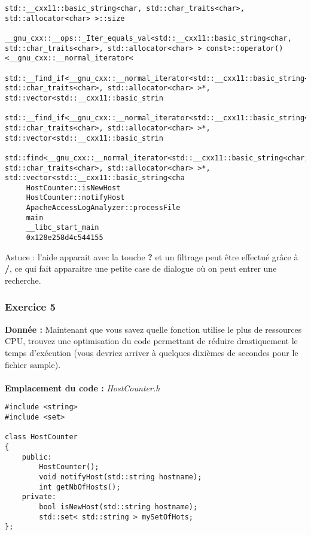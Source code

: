 \begin{lstlisting}
std::__cxx11::basic_string<char, std::char_traits<char>, std::allocator<char> >::size                                                                              
     __gnu_cxx::__ops::_Iter_equals_val<std::__cxx11::basic_string<char, std::char_traits<char>, std::allocator<char> > const>::operator()<__gnu_cxx::__normal_iterator<
     std::__find_if<__gnu_cxx::__normal_iterator<std::__cxx11::basic_string<char, std::char_traits<char>, std::allocator<char> >*, std::vector<std::__cxx11::basic_strin
     std::__find_if<__gnu_cxx::__normal_iterator<std::__cxx11::basic_string<char, std::char_traits<char>, std::allocator<char> >*, std::vector<std::__cxx11::basic_strin
     std::find<__gnu_cxx::__normal_iterator<std::__cxx11::basic_string<char, std::char_traits<char>, std::allocator<char> >*, std::vector<std::__cxx11::basic_string<cha
     HostCounter::isNewHost                                                                                                                                             
     HostCounter::notifyHost                                                                                                                                            
     ApacheAccessLogAnalyzer::processFile                                                                                                                               
     main                                                                                                                                                               
     __libc_start_main                                                                                                                                                  
     0x128e258d4c544155 
\end{lstlisting}
Astuce : l'aide apparait avec la touche \textbf{?} et un filtrage peut être effectué grâce à \textbf{/}, ce qui fait apparaitre une petite case de dialogue où on peut entrer une recherche.

\subsubsection{Exercice 5}
\textbf{Donnée : } Maintenant	que	vous	savez	quelle	fonction	utilise	le	plus	de	ressources	CPU,	trouvez	une	optimisation	
du	code	permettant	de	réduire	drastiquement	le	temps	d'exécution	(vous	devriez	arriver	à	quelques	
dixièmes	de	secondes	pour	le	fichier	sample).\\\\
\textbf{Emplacement du code : } \textit{HostCounter.h}
\begin{lstlisting}
#include <string>
#include <set>

class HostCounter
{
    public:
        HostCounter();
        void notifyHost(std::string hostname);
        int getNbOfHosts();
    private:
        bool isNewHost(std::string hostname);
        std::set< std::string > mySetOfHots;
};
\end{lstlisting}

